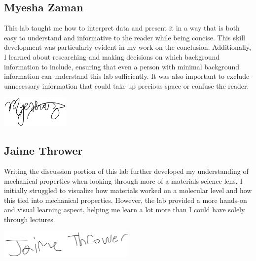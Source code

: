 \documentclass[11pt]{article}
\begin{document}
        \subsection{Myesha Zaman}
            This lab taught me how to interpret data and present it in a way that is both easy to understand and informative to the reader while being concise. 
            This skill development was particularly evident in my work on the conclusion. 
            Additionally, I learned about researching and making decisions on which background information to include, ensuring that even a person with minimal background information can understand this lab sufficiently. 
            It was also important to exclude unnecessary information that could take up precious space or confuse the reader.

            \bigskip
            \includegraphics[width=0.25\textwidth]{myesha.png}
        \subsection{Jaime Thrower}
            Writing the discussion portion of this lab further developed my understanding of mechanical properties when looking through more of a materials science lens. 
            I initially struggled to visualize how materials worked on a molecular level and how this tied into mechanical properties. 
            However, the lab provided a more hands-on and visual learning aspect, helping me learn a lot more than I could have solely through lectures.

            \bigskip
            \includegraphics[width=0.5\textwidth]{jaime.png}

    \printbibliography{}

    \appendix
\end{document}
